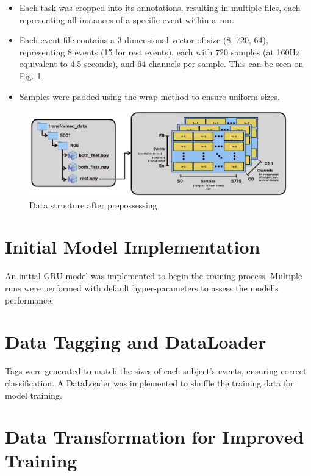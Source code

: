 \documentclass[11pt, a4paper, oneside]{assets/tex/thesis} %
\begin{document}
{\begin{itemize}
    \item Each task was cropped into its annotations, resulting in multiple files, each representing all instances of a specific event within a run.
    \item Each event file contains a 3-dimensional vector of size (8, 720, 64), representing 8 events (15 for rest events), each with 720 samples (at 160Hz, equivalent to 4.5 seconds), and 64 channels per sample. This can be seen on Fig. \ref{fig:data-structure}
    \item Samples were padded using the wrap method to ensure uniform sizes.
\end{itemize}
\begin{figure}[h]
    \centering
    \includegraphics[width=1\linewidth]{assets/img/data_structure.png}
    \caption{Data structure after prepossessing}
    \label{fig:data-structure}
\end{figure}

\section{Initial Model Implementation}

An initial GRU model was implemented to begin the training process. Multiple runs were performed with default hyper-parameters to assess the model's performance.

\section{Data Tagging and DataLoader}

Tags were generated to match the sizes of each subject's events, ensuring correct classification. A DataLoader was implemented to shuffle the training data for model training.

\section{Data Transformation for Improved Training}

}
\end{document}
